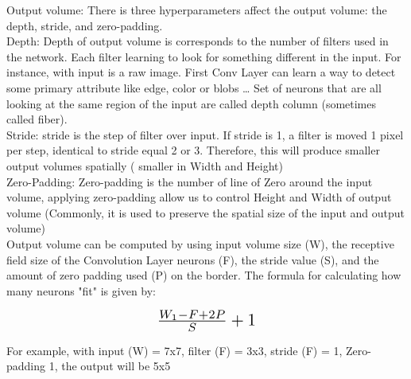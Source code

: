 Output volume: There is three hyperparameters affect the output volume: the depth, stride, and zero-padding.\\
Depth: Depth of output volume is corresponds to the number of filters used in the network. Each filter learning to look for something different in the input. For instance, with input is a raw image. First Conv Layer can learn a way to detect some primary attribute like edge, color or blobs … Set of neurons that are all looking at the same region of the input are called depth column (sometimes called fiber).\\
Stride: stride is the step of filter over input. If stride is 1, a filter is moved 1 pixel per step, identical to stride equal 2 or 3. Therefore, this will produce smaller output volumes spatially ( smaller in Width and Height)\\
Zero-Padding: Zero-padding is the number of line of Zero around the input volume, applying zero-padding allow us to control Height and Width of output volume (Commonly, it is used to preserve the spatial size of the input and output volume)\\
Output volume can be computed by using input volume size (W), the receptive field size of the Convolution Layer neurons (F), the stride value (S), and the amount of zero padding used (P) on the border. The formula for calculating how many neurons "fit" is given by:
\begin{center}
\[ \scalebox{1.5}{$\frac{W_{1} - F + 2P }{S} + 1$} \]
\end{center}
For example, with input (W) = 7x7, filter (F) = 3x3, stride (F) = 1, Zero-padding 1, the output will be 5x5

